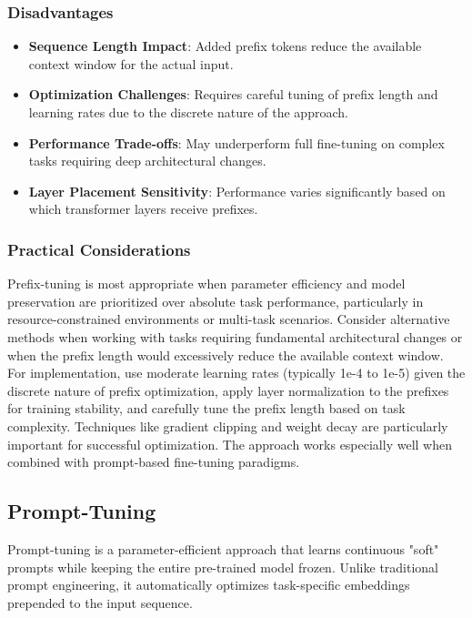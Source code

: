 \subsubsection{Disadvantages}
\begin{itemize}
    \item \textbf{Sequence Length Impact}: Added prefix tokens reduce the available context window for the actual input.
    
    \item \textbf{Optimization Challenges}: Requires careful tuning of prefix length and learning rates due to the discrete nature of the approach.
    
    \item \textbf{Performance Trade-offs}: May underperform full fine-tuning on complex tasks requiring deep architectural changes.
    
    \item \textbf{Layer Placement Sensitivity}: Performance varies significantly based on which transformer layers receive prefixes.
\end{itemize}

\subsubsection{Practical Considerations}
Prefix-tuning is most appropriate when parameter efficiency and model preservation are prioritized over absolute task performance, particularly in resource-constrained environments or multi-task scenarios. Consider alternative methods when working with tasks requiring fundamental architectural changes or when the prefix length would excessively reduce the available context window. For implementation, use moderate learning rates (typically 1e-4 to 1e-5) given the discrete nature of prefix optimization, apply layer normalization to the prefixes for training stability, and carefully tune the prefix length based on task complexity. Techniques like gradient clipping and weight decay are particularly important for successful optimization. The approach works especially well when combined with prompt-based fine-tuning paradigms.

\subsection{Prompt-Tuning}

Prompt-tuning is a parameter-efficient approach that learns continuous "soft" prompts while keeping the entire pre-trained model frozen. Unlike traditional prompt engineering, it automatically optimizes task-specific embeddings prepended to the input sequence.

